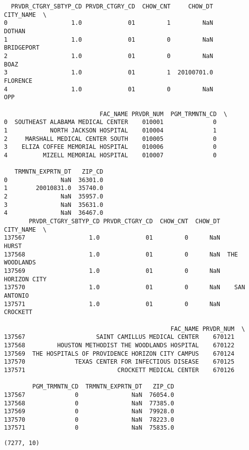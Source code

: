\documentclass[
  letterpaper,
  DIV=11,
  numbers=noendperiod]{scrartcl}
\begin{document}
\begin{verbatim}
  PRVDR_CTGRY_SBTYP_CD PRVDR_CTGRY_CD  CHOW_CNT     CHOW_DT   CITY_NAME  \
0                  1.0             01         1         NaN      DOTHAN   
1                  1.0             01         0         NaN  BRIDGEPORT   
2                  1.0             01         0         NaN        BOAZ   
3                  1.0             01         1  20100701.0    FLORENCE   
4                  1.0             01         0         NaN         OPP   

                           FAC_NAME PRVDR_NUM  PGM_TRMNTN_CD  \
0  SOUTHEAST ALABAMA MEDICAL CENTER    010001              0   
1            NORTH JACKSON HOSPITAL    010004              1   
2     MARSHALL MEDICAL CENTER SOUTH    010005              0   
3    ELIZA COFFEE MEMORIAL HOSPITAL    010006              0   
4          MIZELL MEMORIAL HOSPITAL    010007              0   

   TRMNTN_EXPRTN_DT   ZIP_CD  
0               NaN  36301.0  
1        20010831.0  35740.0  
2               NaN  35957.0  
3               NaN  35631.0  
4               NaN  36467.0  
       PRVDR_CTGRY_SBTYP_CD PRVDR_CTGRY_CD  CHOW_CNT  CHOW_DT      CITY_NAME  \
137567                  1.0             01         0      NaN          HURST   
137568                  1.0             01         0      NaN  THE WOODLANDS   
137569                  1.0             01         0      NaN   HORIZON CITY   
137570                  1.0             01         0      NaN    SAN ANTONIO   
137571                  1.0             01         0      NaN       CROCKETT   

                                               FAC_NAME PRVDR_NUM  \
137567                    SAINT CAMILLUS MEDICAL CENTER    670121   
137568         HOUSTON METHODIST THE WOODLANDS HOSPITAL    670122   
137569  THE HOSPITALS OF PROVIDENCE HORIZON CITY CAMPUS    670124   
137570              TEXAS CENTER FOR INFECTIOUS DISEASE    670125   
137571                          CROCKETT MEDICAL CENTER    670126   

        PGM_TRMNTN_CD  TRMNTN_EXPRTN_DT   ZIP_CD  
137567              0               NaN  76054.0  
137568              0               NaN  77385.0  
137569              0               NaN  79928.0  
137570              0               NaN  78223.0  
137571              0               NaN  75835.0  
\end{verbatim}

\begin{verbatim}
(7277, 10)
\end{verbatim}
\end{document}
